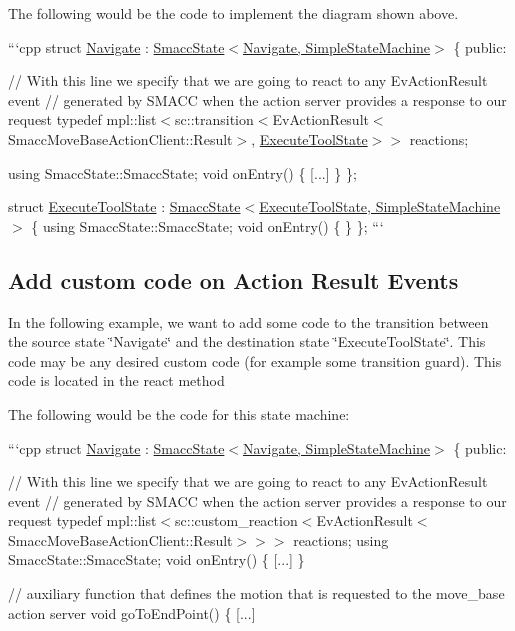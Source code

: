  

The following would be the code to implement the diagram shown above.

```cpp struct \hyperlink{structNavigate}{Navigate} \-: \hyperlink{classsmacc_1_1SmaccState}{Smacc\-State$<$\-Navigate, Simple\-State\-Machine$>$} \{ public\-:

// With this line we specify that we are going to react to any Ev\-Action\-Result event // generated by S\-M\-A\-C\-C when the action server provides a response to our request typedef mpl\-::list$<$sc\-::transition$<$Ev\-Action\-Result$<$\-Smacc\-Move\-Base\-Action\-Client\-::\-Result$>$, \hyperlink{structExecuteToolState}{Execute\-Tool\-State}$>$$>$ reactions;

using Smacc\-State\-::\-Smacc\-State; void on\-Entry() \{ \mbox{[}...\mbox{]} \} \};

struct \hyperlink{structExecuteToolState}{Execute\-Tool\-State} \-: \hyperlink{classsmacc_1_1SmaccState}{Smacc\-State$<$\-Execute\-Tool\-State, Simple\-State\-Machine$>$} \{ using Smacc\-State\-::\-Smacc\-State; void on\-Entry() \{ \} \}; ```

\subsection*{Add custom code on Action Result Events}

In the following example, we want to add some code to the transition between the source state \char`\"{}\-Navigate\char`\"{} and the destination state \char`\"{}\-Execute\-Tool\-State\char`\"{}. This code may be any desired custom code (for example some transition guard). This code is located in the react method

 

The following would be the code for this state machine\-:

```cpp struct \hyperlink{structNavigate}{Navigate} \-: \hyperlink{classsmacc_1_1SmaccState}{Smacc\-State$<$\-Navigate, Simple\-State\-Machine$>$} \{ public\-:

// With this line we specify that we are going to react to any Ev\-Action\-Result event // generated by S\-M\-A\-C\-C when the action server provides a response to our request typedef mpl\-::list$<$sc\-::custom\-\_\-reaction$<$Ev\-Action\-Result$<$\-Smacc\-Move\-Base\-Action\-Client\-::\-Result$>$$>$$>$ reactions; using Smacc\-State\-::\-Smacc\-State; void on\-Entry() \{ \mbox{[}...\mbox{]} \}

// auxiliary function that defines the motion that is requested to the move\-\_\-base action server void go\-To\-End\-Point() \{ \mbox{[}...\mbox{]}

